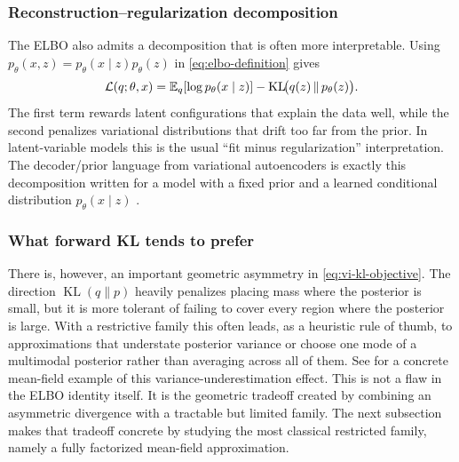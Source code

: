 \subsubsection{Reconstruction--regularization decomposition}

The ELBO also admits a decomposition that is often more interpretable.
Using \(p_\theta(x,z)=p_\theta(x\mid z)p_\theta(z)\) in \eqref{eq:elbo-definition} gives
\begin{equation}
  \mathcal{L}(q;\theta,x)
  =
  \mathbb{E}_q[\log p_\theta(x\mid z)]
  -
  \operatorname{KL}\!\bigl(q(z)\,\|\,p_\theta(z)\bigr).
  \label{eq:elbo-reconstruction-regularization}
\end{equation}
The first term rewards latent configurations that explain the data well, while the second penalizes variational distributions that drift too far from the prior.
In latent-variable models this is the usual ``fit minus regularization'' interpretation.
The decoder/prior language from variational autoencoders is exactly this decomposition written for a model with a fixed prior and a learned conditional distribution \(p_\theta(x\mid z)\) \citep[\S2.2]{kingma_welling_2014_aevb}.

\subsubsection{What forward KL tends to prefer}

There is, however, an important geometric asymmetry in \eqref{eq:vi-kl-objective}.
The direction $\operatorname{KL}(q\|p)$ heavily penalizes placing mass where the posterior is small, but it is more tolerant of failing to cover every region where the posterior is large.
With a restrictive family this often leads, as a heuristic rule of thumb, to approximations that understate posterior variance or choose one mode of a multimodal posterior rather than averaging across all of them.
See \citet[\S2.4 and Fig.~1]{blei_kucukelbir_mcauliffe_2017_vi_review} for a concrete mean-field example of this variance-underestimation effect.
This is not a flaw in the ELBO identity itself.
It is the geometric tradeoff created by combining an asymmetric divergence with a tractable but limited family.
The next subsection makes that tradeoff concrete by studying the most classical restricted family, namely a fully factorized mean-field approximation.
